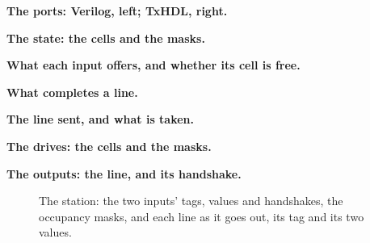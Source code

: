 \newcommand{\sidebyside}[2]{%
\noindent\textbf{#2}\par\nopagebreak\vspace{2pt}%
\noindent\begin{minipage}[t]{0.49\linewidth}

\end{minipage}\hfill
\begin{minipage}[t]{0.49\linewidth}

\end{minipage}\par\vspace{6pt}}

\sidebyside{ports}{The ports: Verilog, left; TxHDL, right.}
\sidebyside{state}{The state: the cells and the masks.}
\sidebyside{reads}{What each input offers, and whether its cell is free.}
\sidebyside{completes}{What completes a line.}
\sidebyside{takes}{The line sent, and what is taken.}
\sidebyside{drives}{The drives: the cells and the masks.}
\sidebyside{outputs}{The outputs: the line, and its handshake.}

\begin{figure}[htbp]
\centering

\caption{The station: the two inputs' tags, values and handshakes,
the occupancy masks, and each line as it goes out, its tag and its
two values.}
\label{fig:x-station}
\end{figure}




